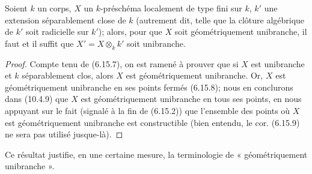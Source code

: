 \begin{corollary}[6.15.9]
\label{IV.2.s6.15.9-fr}
Soient $k$ un corps, $X$ un $k$-préschéma localement de type fini sur $k$,
$k'$ une extension séparablement close de $k$ (autrement dit, telle que la
clôture algébrique de $k'$ soit radicielle sur $k'$); alors, pour que $X$
soit géométriquement unibranche, il faut et il suffit que
$X'=X\otimes_k k'$ soit unibranche.
\end{corollary}

\begin{proof}
Compte tenu de (6.15.7), on est ramené à prouver que si $X$ est unibranche
et $k$ séparablement clos, alors $X$ est géométriquement unibranche. Or, $X$
est géométriquement unibranche en ses points fermés (6.15.8); nous en
conclurons dans (10.4.9) que $X$ est géométriquement unibranche en tous ses
points, en nous appuyant sur le fait (signalé à la fin de (6.15.2)) que
l'ensemble des points où $X$ est géométriquement unibranche est
constructible (bien entendu, le cor. (6.15.9) ne sera pas utilisé
jusque-là).
\end{proof}

Ce résultat justifie, en une certaine mesure, la terminologie de
« géométriquement unibranche ».

